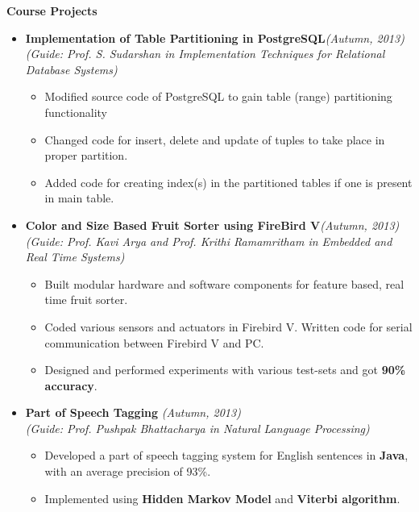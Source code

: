 \documentclass[a4paper,11pt]{article}
\newcommand{\resheading}[1]{{\small \colorbox{mygrey}{\begin{minipage}{0.975\textwidth}{\textbf{#1 \vphantom{p\^{E}}}}\end{minipage}}}}
\begin{document}
\resheading{\textbf{\large Course Projects } }
\begin{description}
\item
\begin{itemize}
\item \textbf{Implementation of Table Partitioning in PostgreSQL}\hfill \textit{(Autumn, 2013)}\\
\textit{(Guide: Prof. S. Sudarshan in Implementation Techniques for Relational Database Systems)} \hfill 
\begin{itemize}
  \item Modified source code of PostgreSQL to gain table (range) partitioning functionality
  \item Changed code for insert, delete and update of tuples to take place in proper partition.
  \item Added code for creating index(s) in the partitioned tables if one is present in main table.
\end{itemize}
\end{itemize}

\item 
\begin{itemize}
\item \textbf{Color and Size Based Fruit Sorter using FireBird V}\hfill \textit{(Autumn, 2013)}\\
\textit{(Guide: Prof. Kavi Arya and Prof. Krithi Ramamritham in Embedded and Real Time Systems)}
\begin{itemize}
\item Built modular hardware and software components for feature based, real time fruit sorter.
\item Coded various sensors and actuators in Firebird V. Written code for serial communication between Firebird V and PC.
\item Designed and performed experiments with various test-sets and got \textbf{90\% accuracy}. 
\end{itemize}
\end{itemize}


\item 

\begin{itemize}
\item \textbf{Part of Speech Tagging} \hfill \textit{(Autumn, 2013)}\\
\textit{(Guide: Prof. Pushpak Bhattacharya in Natural Language Processing)}
\begin{itemize}
\item Developed a part of speech tagging system for English sentences in \textbf{Java}, with an average precision of 93\%.
\item Implemented using \textbf{Hidden Markov Model} and \textbf{Viterbi algorithm}.
\end{itemize}
\end{itemize}
\item 



\end{description}
\end{document}
